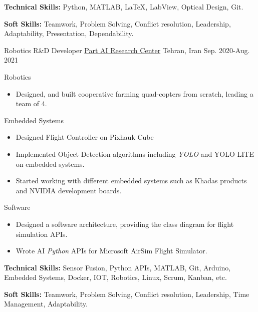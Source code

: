 \begin{cventries}
{\begin{cvitems}
\begin{itemize}[label= - ]
        \end{itemize}
          \item {\textbf{Technical Skills:} Python, MATLAB, \LaTeX, LabView, Optical Design, Git.}
        \item {\textbf{Soft Skills:} Teamwork, Problem Solving, Conflict resolution, Leadership, Adaptability, Presentation, Dependability.}
      \end{cvitems}
    }
  
  \cventry
{Robotics R\&D Developer}  %
    {\href{https://ir.linkedin.com/company/partdp-ai}{Part AI Research Center}} %
    {Tehran, Iran} %
    {Sep. 2020-Aug. 2021} %
    {
      \begin{cvitems} %
                \item{Robotics}
        \begin{itemize}[label= - ]
            \item {Designed, and built cooperative farming quad-copters from scratch, leading a team of 4.}
        \end{itemize}
        \item{Embedded Systems}
        \begin{itemize}[label=-]
            \item {Designed Flight Controller on Pixhauk Cube}
            \item {Implemented Object Detection algorithms including \textit{YOLO} and YOLO LITE on embedded systems.}
            \item {Started working with different embedded systems such as Khadas products and NVIDIA development boards.}
        \end{itemize}
        \item{Software}
        \begin{itemize}[label = -]
        \item {Designed a software architecture, providing the class diagram for flight simulation APIs.}
            \item {Wrote AI \textit{Python} APIs for Microsoft AirSim Flight Simulator.}
        \end{itemize}
        \item {\textbf{Technical Skills:} Sensor Fusion, Python APIs, MATLAB, Git, Arduino, Embedded Systems, Docker, IOT, Robotics, Linux, Scrum, Kanban, etc.}
        \item {\textbf{Soft Skills:} Teamwork, Problem Solving, Conflict resolution, Leadership, Time Management, Adaptability.}

\end{cvitems}}
\end{cventries}
